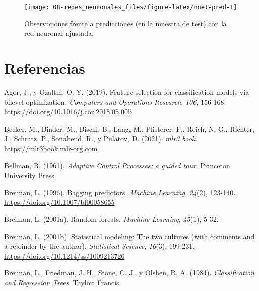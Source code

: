 \documentclass[
]{book}
\newlength{\cslhangindent}
\newlength{\cslentryspacingunit} %
\newenvironment{CSLReferences}[2] %
 {%
  \setlength{\parindent}{0pt}
  \ifodd #1
  \let\oldpar\par
  \def\par{\hangindent=\cslhangindent\oldpar}
  \fi
  \setlength{\parskip}{#2\cslentryspacingunit}
 }%
 {}
\theoremstyle{break}
\theoremstyle{nonumberplain}
\begin{document}
\begin{figure}[!htb]

{\centering \texttt{[image: 08-redes\_neuronales\_files/figure-latex/nnet-pred-1]} 

}

\caption{Observaciones frente a predicciones (en la muestra de test) con la red neuronal ajustada.}\label{fig:nnet-pred}
\end{figure}

\hypertarget{referencias}{%
\chapter*{Referencias}\label{referencias}}

\hypertarget{refs}{}
\begin{CSLReferences}{1}{0}
\leavevmode{}%
Agor, J., y Özaltın, O. Y. (2019). Feature selection for classification models via bilevel optimization. \emph{Computers and Operations Research}, \emph{106}, 156-168. \url{https://doi.org/10.1016/j.cor.2018.05.005}

\leavevmode{}%
Becker, M., Binder, M., Bischl, B., Lang, M., Pfisterer, F., Reich, N. G., Richter, J., Schratz, P., Sonabend, R., y Pulatov, D. (2021). \emph{mlr3 book}. \url{https://mlr3book.mlr-org.com}

\leavevmode{}%
Bellman, R. (1961). \emph{Adaptive Control Processes: a guided tour}. Princeton University Press.

\leavevmode{}%
Breiman, L. (1996). Bagging predictors. \emph{Machine Learning}, \emph{24}(2), 123-140. \url{https://doi.org/10.1007/bf00058655}

\leavevmode{}%
Breiman, L. (2001a). Random forests. \emph{Machine Learning}, \emph{45}(1), 5-32.

\leavevmode{}%
Breiman, L. (2001b). Statistical modeling: The two cultures (with comments and a rejoinder by the author). \emph{Statistical Science}, \emph{16}(3), 199-231. \url{https://doi.org/10.1214/ss/1009213726}

\leavevmode{}%
Breiman, L., Friedman, J. H., Stone, C. J., y Olshen, R. A. (1984). \emph{Classification and Regression Trees}. Taylor; Francis.


\end{CSLReferences}
\end{document}
